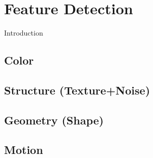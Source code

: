 \section{Feature Detection}
Introduction
\subsection{Color}
\subsection{Structure (Texture+Noise)}
\subsection{Geometry (Shape)}
\subsection{Motion}
